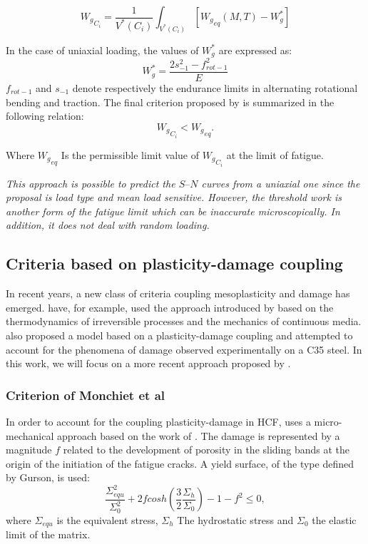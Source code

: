 $${W_g}_{C_i}=\dfrac{1}{V^*(C_i)}\int_{V^*(C_i)}\left[{W_g}_{eq}(M,T)- W_g^*\right] $$

In the case of uniaxial loading, the values of $W_g^*$ are expressed as:
$$W_g^*=\dfrac{2s_{-1}^2-f_{rot-1}^2}{E}$$
$f_{rot-1}$ and $s_{-1}$ denote respectively the endurance limits in alternating rotational bending and traction.
The final criterion proposed by \cite{banvillet2003volumetric} is summarized in the following relation:
$${W_g}_{C_i}<{W_g}_{eq}.$$

Where ${W_g}_{eq}$ Is the permissible limit value of ${W_g}_{C_i}$  at the limit of fatigue.

\textit{This approach is possible to predict the $S–N$ curves from
	a uniaxial one since the proposal is load type and mean
	load sensitive. However, the threshold work is another form of the fatigue limit which can be inaccurate microscopically. In addition, it does not deal with random loading.}

\subsection{Criteria based on plasticity-damage coupling}
In recent years, a new class of criteria coupling mesoplasticity and damage has emerged.  \cite{lemaitre1999two} have, for example, used the approach introduced by \cite{lemaitre1985mecanique} based on the thermodynamics of irreversible processes and the mechanics of continuous media.  \cite{flaceliere2004contribution} also proposed a model based on a plasticity-damage coupling and attempted to account for the phenomena of damage observed experimentally on a C35 steel. In this work, we will focus on a more recent approach proposed by \cite{monchiet2006contributions}.
\subsubsection{Criterion of Monchiet et al}
In order to account for the coupling plasticity-damage in HCF, \cite{monchiet2006contributions} uses a micro-mechanical approach based on the work of  \cite{gurson1977continuum}. The damage is represented by a magnitude $f$ related to the development of porosity in the sliding bands at the origin of the initiation of the fatigue cracks. A yield surface, of the type defined by Gurson, is used:
\begin{equation}
\dfrac{\Sigma_{equ}^2}{\Sigma_0^2}+2fcosh\left(\dfrac{3}{2}\dfrac{\Sigma_h}{\Sigma_0}\right)-1-f^2\leqslant 0 ,
\label{eq.monchiet1}
\end{equation}
where $\Sigma_{equ}$ is the equivalent stress, $\Sigma_h$ The hydrostatic stress and $\Sigma_0$ the elastic limit of the matrix.


